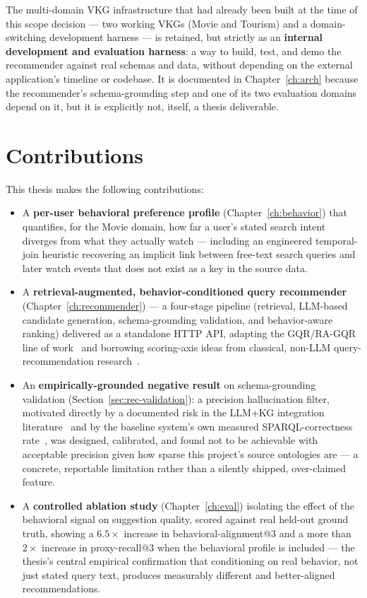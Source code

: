 \documentclass[11pt,a4paper,oneside]{book}
\begin{document}
The multi-domain VKG infrastructure that had already been built at the time of this scope decision
--- two working VKGs (Movie and Tourism) and a domain-switching development harness --- is retained,
but strictly as an \textbf{internal development and evaluation harness}: a way to build, test, and
demo the recommender against real schemas and data, without depending on the external
application's timeline or codebase. It is documented in Chapter~\ref{ch:arch} because the
recommender's schema-grounding step and one of its two evaluation domains depend on it, but it is
explicitly not, itself, a thesis deliverable.

\section{Contributions}
\label{sec:intro-contrib}

This thesis makes the following contributions:

\begin{itemize}
    \item A \textbf{per-user behavioral preference profile} (Chapter~\ref{ch:behavior}) that
        quantifies, for the Movie domain, how far a user's stated search intent diverges from what
        they actually watch --- including an engineered temporal-join heuristic recovering an
        implicit link between free-text search queries and later watch events that does not exist
        as a key in the source data.
    \item A \textbf{retrieval-augmented, behavior-conditioned query recommender}
        (Chapter~\ref{ch:recommender}) --- a four-stage pipeline (retrieval, LLM-based candidate
        generation, schema-grounding validation, and behavior-aware ranking) delivered as a
        standalone HTTP API, adapting the GQR/RA-GQR line of work~\cite{bacciu2024} and borrowing
        scoring-axis ideas from classical, non-LLM query-recommendation research~\cite{barman2024}.
    \item An \textbf{empirically-grounded negative result} on schema-grounding validation
        (Section~\ref{sec:rec-validation}): a precision hallucination filter, motivated directly by
        a documented risk in the LLM+KG integration literature~\cite{pan2024} and by the baseline
        system's own measured SPARQL-correctness rate~\cite{balasooriya2026}, was designed,
        calibrated, and found not to be achievable with acceptable precision given how sparse this
        project's source ontologies are --- a concrete, reportable limitation rather than a silently
        shipped, over-claimed feature.
    \item A \textbf{controlled ablation study} (Chapter~\ref{ch:eval}) isolating the effect of the
        behavioral signal on suggestion quality, scored against real held-out ground truth, showing
        a $6.5\times$ increase in behavioral-alignment@3 and a more than $2\times$ increase in
        proxy-recall@3 when the behavioral profile is included --- the thesis's central empirical
        confirmation that conditioning on real behavior, not just stated query text, produces
        measurably different and better-aligned recommendations.
\end{itemize}
\end{document}
